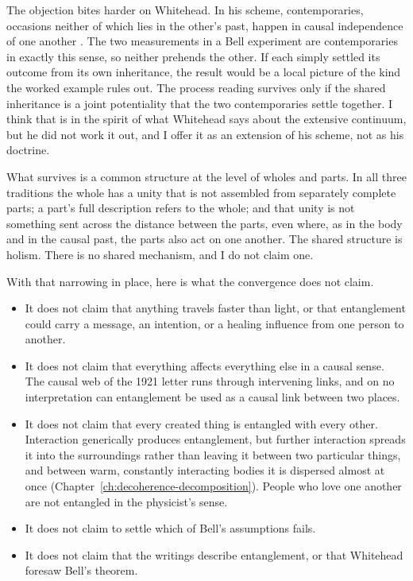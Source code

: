 The objection bites harder on Whitehead. In his scheme, contemporaries, occasions neither of which lies in the other's past, happen in causal independence of one another \citep{Whitehead1929,Whitehead1933}. The two measurements in a Bell experiment are contemporaries in exactly this sense, so neither prehends the other. If each simply settled its outcome from its own inheritance, the result would be a local picture of the kind the worked example rules out. The process reading survives only if the shared inheritance is a joint potentiality that the two contemporaries settle together. I think that is in the spirit of what Whitehead says about the extensive continuum, but he did not work it out, and I offer it as an extension of his scheme, not as his doctrine.

What survives is a common structure at the level of wholes and parts. In all three traditions the whole has a unity that is not assembled from separately complete parts; a part's full description refers to the whole; and that unity is not something sent across the distance between the parts, even where, as in the body and in the causal past, the parts also act on one another. The shared structure is holism. There is no shared mechanism, and I do not claim one.

With that narrowing in place, here is what the convergence does not claim.

\begin{itemize}
\item It does not claim that anything travels faster than light, or that entanglement could carry a message, an intention, or a healing influence from one person to another.
\item It does not claim that everything affects everything else in a causal sense. The causal web of the 1921 letter runs through intervening links, and on no interpretation can entanglement be used as a causal link between two places.
\item It does not claim that every created thing is entangled with every other. Interaction generically produces entanglement, but further interaction spreads it into the surroundings rather than leaving it between two particular things, and between warm, constantly interacting bodies it is dispersed almost at once (Chapter~\ref{ch:decoherence-decomposition}). People who love one another are not entangled in the physicist's sense.
\item It does not claim to settle which of Bell's assumptions fails.
\item It does not claim that the \bahai writings describe entanglement, or that Whitehead foresaw Bell's theorem.
\end{itemize}

